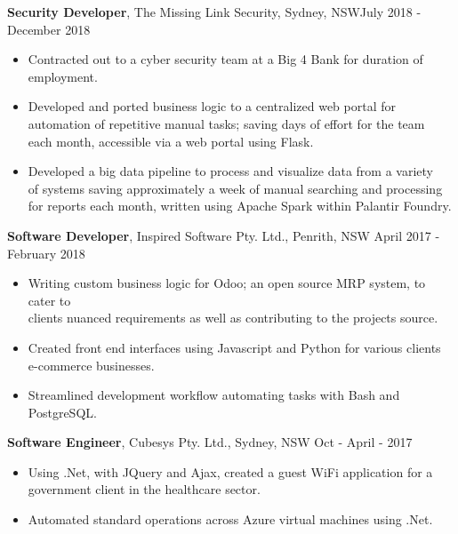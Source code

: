 \documentclass[margin]{res}
\begin{document}
\begin{resume}
\begin{itemize}
\end{itemize}

{\bf Security Developer},
	The Missing Link Security, Sydney, NSW\hfill July 2018 - December 2018
\begin{itemize} \itemsep 2pt  %
\item Contracted out to a cyber security team at a Big 4 Bank for duration of \\
	employment.

\item Developed and ported business logic to a centralized web portal for \\
	automation of repetitive manual tasks; saving days of effort for the team \\
		each month, accessible via a web portal using Flask.

\item Developed a big data pipeline to process and visualize data from a variety \\
	of systems saving approximately a week of manual searching and processing \\
		for reports each month, written using Apache Spark within Palantir Foundry.

\end{itemize}

{\bf Software Developer},
	Inspired Software Pty. Ltd., Penrith, NSW \hfill April 2017 - February 2018
\begin{itemize} \itemsep 2pt  %
\item Writing custom business logic for Odoo; an open source MRP system, to cater to \\
	clients nuanced requirements as well as contributing to the projects source.

\item  Created front end interfaces using Javascript and Python for various clients \\
	e-commerce businesses.

\item Streamlined development workflow automating tasks with Bash and PostgreSQL.
\end{itemize}

 {\bf Software Engineer},
	Cubesys Pty. Ltd., Sydney, NSW \hfill Oct - April - 2017
 \begin{itemize} \itemsep 2pt  %
 \item Using .Net, with JQuery and Ajax, created a guest WiFi application for a \\
	 government client in the healthcare sector.
 \item Automated standard operations across Azure virtual machines using .Net.
 \end{itemize}


\end{resume}
\end{document}
